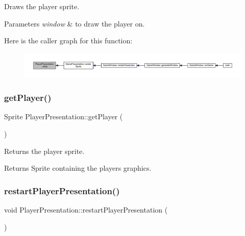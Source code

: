 Draws the player sprite. 


\begin{DoxyParams}{Parameters}
{\em window} & to draw the player on. \\
\hline
\end{DoxyParams}
Here is the caller graph for this function\+:\nopagebreak
\begin{figure}[H]
\begin{center}
\leavevmode
\includegraphics[width=350pt]{class_player_presentation_a0ee08eeb4f0c8687450f60d635b4fe8a_icgraph}
\end{center}
\end{figure}
\mbox{\label{class_player_presentation_a5ce015d2ac13d9e3eacf89b96da31ee2}} 
\subsubsection{\texorpdfstring{get\+Player()}{getPlayer()}}
{\footnotesize\ttfamily Sprite Player\+Presentation\+::get\+Player (\begin{DoxyParamCaption}{ }\end{DoxyParamCaption})}



Returns the player sprite. 

\begin{DoxyReturn}{Returns}
Sprite containing the players graphics. 
\end{DoxyReturn}
\mbox{\label{class_player_presentation_ae4bf63751b63f582902d4ea31e06a486}} 
\subsubsection{\texorpdfstring{restart\+Player\+Presentation()}{restartPlayerPresentation()}}
{\footnotesize\ttfamily void Player\+Presentation\+::restart\+Player\+Presentation (\begin{DoxyParamCaption}{ }\end{DoxyParamCaption})}



